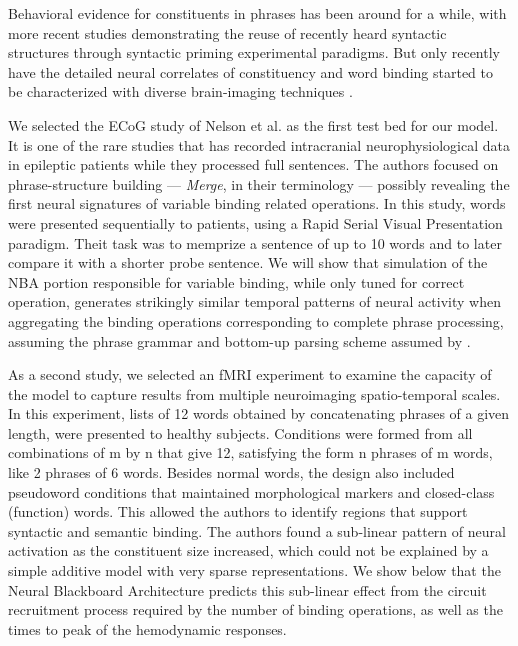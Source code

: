 \documentclass[10pt]{article}
\begin{document}
Behavioral evidence for constituents in phrases has been around for a while\cite{bever1969underlying, abrams1969syntactic}, with more recent studies demonstrating the reuse of 
recently heard syntactic structures through syntactic priming experimental paradigms\cite{bock2007persistent, branigan2000syntactic}.
But only recently have the detailed neural correlates of constituency and word binding started to be characterized with diverse brain-imaging techniques 
\cite{Nelson_2017, fedorenko2016neural, brennan2016abstract, ding2016cortical, bemis2012basic, Pallier_2011, bastiaansen2010syntactic, longe2006grammatical}.

We selected the ECoG study of Nelson et al.\cite{Nelson_2017} as the first test bed for our model.
It is one of the rare studies that has recorded intracranial neurophysiological data in epileptic patients while they processed full sentences.
The authors focused on phrase-structure building --- \emph{Merge}, in their terminology --- possibly revealing the first neural signatures of variable binding related operations.
In this study, words were presented sequentially to patients, using a Rapid Serial Visual Presentation paradigm.
Theit task was to memprize a sentence of up to 10 words and to later compare it with a shorter probe sentence.
We will show that simulation of the NBA portion responsible for variable binding, while only tuned for correct operation, generates strikingly similar temporal patterns of neural activity when aggregating the binding operations corresponding to complete phrase processing, assuming the phrase grammar and bottom-up parsing scheme assumed by \cite{Nelson_2017}.

As a second study, we selected an fMRI experiment \cite{Pallier_2011} to examine the capacity of the model to capture results from multiple neuroimaging spatio-temporal scales.
In this experiment, lists of 12 words obtained by concatenating phrases of a given length, were presented to healthy subjects.
Conditions were formed from all combinations of m by n that give 12, satisfying the form n phrases of m words, like 2 phrases of 6 words.
Besides normal words, the design also included pseudoword conditions that maintained morphological markers and closed-class (function) words.
This allowed the authors to identify regions that support syntactic and semantic binding. The authors found a sub-linear pattern of neural activation as the constituent size increased, which could not be explained by a simple additive model with very sparse representations. 
We show below that the Neural Blackboard Architecture predicts this sub-linear effect from the circuit recruitment process required by the number of binding operations, as well as the times to peak of the  hemodynamic responses. 
\end{document}

